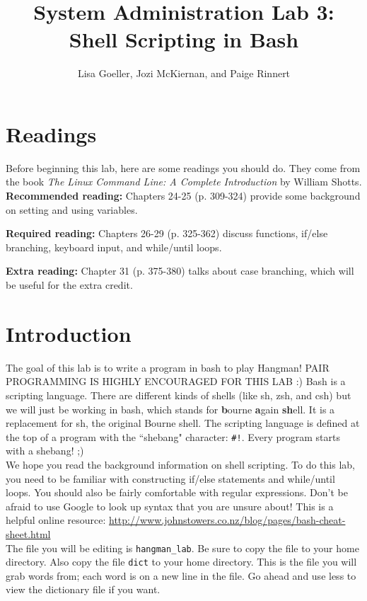 \documentclass{article}
\title{System Administration Lab 3: Shell Scripting in Bash\vspace{-2ex}}
\author{Lisa Goeller, Jozi McKiernan, and Paige Rinnert}
\date{}
\begin{document}
\maketitle

\section*{Readings}
Before beginning this lab, here are some readings you should do. They come from the book \textit{The Linux Command Line: A Complete Introduction} by William Shotts. \\

\textbf{Recommended reading:} Chapters 24-25 (p. 309-324) provide some background on setting and using variables.

\textbf{Required reading:} Chapters 26-29 (p. 325-362) discuss functions, if/else branching, keyboard input, and while/until loops.

\textbf{Extra reading:} Chapter 31 (p. 375-380) talks about case branching, which will be useful for the extra credit.


\section*{Introduction}

\indent\indent The goal of this lab is to write a program in bash to play Hangman! PAIR PROGRAMMING IS HIGHLY ENCOURAGED FOR THIS LAB :) Bash is a scripting language. There are different kinds of shells (like sh, zsh, and csh) but we will just be working in bash, which stands for \textbf{b}ourne \textbf{a}gain \textbf{sh}ell. It is a replacement for sh, the original Bourne shell. The scripting language is defined at the top of a program with the ``shebang" character: \verb|#!|. Every program starts with a shebang! ;) \\

We hope you read the background information on shell scripting. To do this lab, you need to be familiar with constructing if/else statements and while/until loops. You should also be fairly comfortable with regular expressions. Don't be afraid to use Google to look up syntax that you are unsure about! This is a helpful online resource: \url{http://www.johnstowers.co.nz/blog/pages/bash-cheat-sheet.html} \\

The file you will be editing is \verb|hangman_lab|. Be sure to copy the file to your home directory. Also copy the file \verb|dict| to your home directory. This is the file you will grab words from; each word is on a new line in the file. Go ahead and use less to view the dictionary file if you want.
\end{document}
